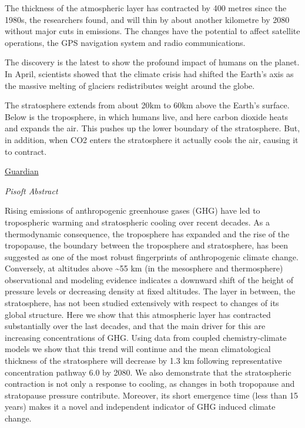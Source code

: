\documentclass[
]{book}
\begin{document}
The thickness of the atmospheric layer has contracted by 400 metres since the 1980s, the researchers found, and will thin by about another kilometre by 2080 without major cuts in emissions. The changes have the potential to affect satellite operations, the GPS navigation system and radio communications.

The discovery is the latest to show the profound impact of humans on the planet. In April, scientists showed that the climate crisis had shifted the Earth's axis as the massive melting of glaciers redistributes weight around the globe.

The stratosphere extends from about 20km to 60km above the Earth's surface. Below is the troposphere, in which humans live, and here carbon dioxide heats and expands the air. This pushes up the lower boundary of the stratosphere. But, in addition, when CO2 enters the stratosphere it actually cools the air, causing it to contract.

\href{https://www.theguardian.com/environment/2021/may/12/emissions-shrinking-the-stratosphere-scientists-find}{Guardian}

\emph{Pisoft Abstract}

Rising emissions of anthropogenic greenhouse gases (GHG) have led to tropospheric warming and stratospheric cooling over recent decades. As a thermodynamic consequence, the troposphere has expanded and the rise of the tropopause, the boundary between the troposphere and stratosphere, has been suggested as one of the most robust fingerprints of anthropogenic climate change. Conversely, at altitudes above \textasciitilde55 km (in the mesosphere and thermosphere) observational and modeling evidence indicates a downward shift of the height of pressure levels or decreasing density at fixed altitudes. The layer in between, the stratosphere, has not been studied extensively with respect to changes of its global structure. Here we show that this atmospheric layer has contracted substantially over the last decades, and that the main driver for this are increasing concentrations of GHG. Using data from coupled chemistry-climate models we show that this trend will continue and the mean climatological thickness of the stratosphere will decrease by 1.3 km following representative concentration pathway 6.0 by 2080. We also demonstrate that the stratospheric contraction is not only a response to cooling, as changes in both tropopause and stratopause pressure contribute. Moreover, its short emergence time (less than 15 years) makes it a novel and independent indicator of GHG induced climate change.
\end{document}
